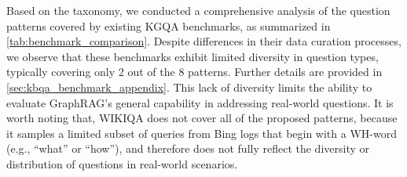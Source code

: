 Based on the taxonomy, we conducted a comprehensive analysis of the question patterns covered by existing KGQA benchmarks, as summarized in \autoref{tab:benchmark_comparison}. Despite differences in their data curation processes, we observe that these benchmarks exhibit limited diversity in question types, typically covering only 2 out of the 8 patterns. Further details are provided in \autoref{sec:kbqa_benchmark_appendix}. This lack of diversity limits the ability to evaluate GraphRAG’s general capability in addressing real-world questions. It is worth noting that, WIKIQA does not cover all of the proposed patterns, because it samples a limited subset of queries from Bing logs that begin with a WH-word (e.g., ``what'' or ``how''), and therefore does not fully reflect the diversity or distribution of questions in real-world scenarios.



